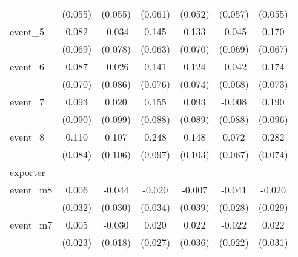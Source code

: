 {\begin{tabular}{l*{6}{c}}
            &     (0.055)         &     (0.055)         &     (0.061)         &     (0.052)         &     (0.057)         &     (0.055)         \\
[1em]
event\_5     &       0.082         &      -0.034         &       0.145\sym{*}  &       0.133         &      -0.045         &       0.170\sym{*}  \\
            &     (0.069)         &     (0.078)         &     (0.063)         &     (0.070)         &     (0.069)         &     (0.067)         \\
[1em]
event\_6     &       0.087         &      -0.026         &       0.141         &       0.124         &      -0.042         &       0.174\sym{*}  \\
            &     (0.070)         &     (0.086)         &     (0.076)         &     (0.074)         &     (0.068)         &     (0.073)         \\
[1em]
event\_7     &       0.093         &       0.020         &       0.155         &       0.093         &      -0.008         &       0.190\sym{*}  \\
            &     (0.090)         &     (0.099)         &     (0.088)         &     (0.089)         &     (0.088)         &     (0.096)         \\
[1em]
event\_8     &       0.110         &       0.107         &       0.248\sym{*}  &       0.148         &       0.072         &       0.282\sym{***}\\
            &     (0.084)         &     (0.106)         &     (0.097)         &     (0.103)         &     (0.067)         &     (0.074)         \\
\hline
exporter    &                     &                     &                     &                     &                     &                     \\
event\_m8    &       0.006         &      -0.044         &      -0.020         &      -0.007         &      -0.041         &      -0.020         \\
            &     (0.032)         &     (0.030)         &     (0.034)         &     (0.039)         &     (0.028)         &     (0.029)         \\
[1em]
event\_m7    &       0.005         &      -0.030         &       0.020         &       0.022         &      -0.022         &       0.022         \\
            &     (0.023)         &     (0.018)         &     (0.027)         &     (0.036)         &     (0.022)         &     (0.031)         \\

\end{tabular}}

